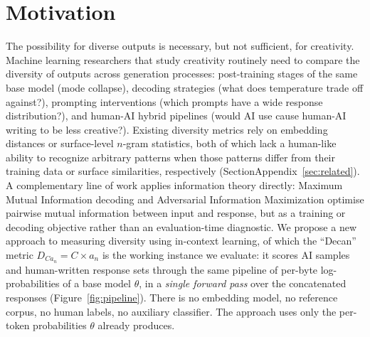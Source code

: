 \section{Motivation}\label{sec:motivation}

The possibility for diverse outputs is necessary, but not sufficient, for creativity.
Machine learning researchers that study creativity
routinely need to compare the diversity of outputs across generation processes: post-training stages of the same base model (mode collapse), decoding strategies (what does temperature trade off against?), prompting interventions (which prompts have a wide response distribution?), and human-AI hybrid pipelines (would AI use cause human-AI writing to be less creative?).
Existing diversity metrics rely on embedding distances \citep{du2019boosting} or surface-level $n$-gram statistics, both of which lack a human-like ability to recognize arbitrary patterns when those patterns differ from their training data or surface similarities, respectively (\ifworkshop Section\else Appendix\fi~\ref{sec:related}).
A complementary line of work applies information theory directly: Maximum Mutual Information decoding \citep{li2016diversity} and Adversarial Information Maximization \citep{zhang2018aim} optimise pairwise mutual information between input and response, but as a training or decoding objective rather than an evaluation-time diagnostic.
We propose a new approach to measuring diversity using in-context learning, of which the ``Decan'' metric $D_{Ca_n} = C \times a_n$ is the working instance we evaluate: it scores AI samples and human-written response sets through the same pipeline of per-byte log-probabilities of a base model $\theta$, in a \emph{single forward pass} over the concatenated responses (Figure~\ref{fig:pipeline}).
There is no embedding model, no reference corpus, no human labels, no auxiliary classifier.
The approach uses only the per-token probabilities $\theta$ already produces.


